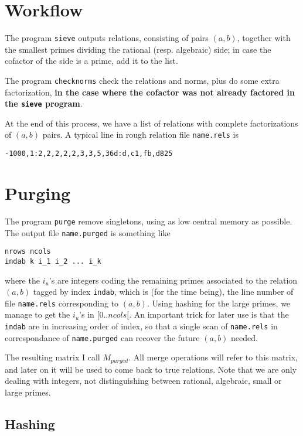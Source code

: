 \documentclass{article}
\begin{document}
\section{Workflow}

The program \verb+sieve+ outputs relations, consisting of pairs $(a,
b)$, together with the smallest primes dividing the rational
(resp. algebraic) side; in case the cofactor of the side is a prime,
add it to the list.

The program \verb+checknorms+ check the relations and norms, plus do
some extra factorization, {\bf in the case where the cofactor was not
already factored in the {\tt sieve} program}.

At the end of this process, we have a list of relations with complete
factorizations of $(a, b)$ pairs. A typical line in rough relation
file \verb+name.rels+ is
\begin{verbatim}
-1000,1:2,2,2,2,2,3,3,5,36d:d,c1,fb,d825
\end{verbatim}

\section{Purging}

The program \verb+purge+ remove singletons, using as low central
memory as possible. The output file \verb+name.purged+ is
something like
\begin{verbatim}
nrows ncols
indab k i_1 i_2 ... i_k
\end{verbatim}
where the $i_u$'s are integers coding the remaining primes
associated to the relation $(a, b)$ tagged by index \verb+indab+,
which is (for the time being), the line number of file
\verb+name.rels+ corresponding to $(a, b)$. Using hashing for the
large primes, we manage to get the $i_u$'s in $[0..ncols[$. An
important trick for later use is that the \verb+indab+ are in
increasing order of index, so that a single scan of \verb+name.rels+
in correspondance of \verb+name.purged+ can recover the future $(a,
b)$ needed. 

The resulting matrix I call $M_{purged}$. All merge operations will
refer to this matrix, and later on it will be used to come back to
true relations. Note that we are only dealing with integers, not
distinguishing between rational, algebraic, small or large primes.

\subsection{Hashing}
\end{document}
